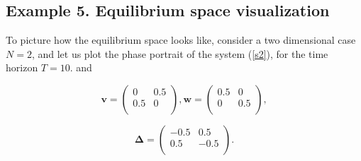 \documentclass[a4paper,10pt, english]{article}
\begin{document}
\newpage
\newpage
\newpage
\subsection{Example 5. Equilibrium space visualization}
To picture how the equilibrium space looks like, consider a two dimensional case  $N=2$, and let us plot the phase portrait of the system (\ref{s2}), for the time horizon $T = 10$. and

\[\mathbf{v} =  \left( \begin{array}{cc}
0 & 0.5  \\
0.5 & 0 \\
\end{array} \right),
%
\mathbf{w} = 
\left( \begin{array}{cc}
0.5 & 0 \\
0 & 0.5 \\
\end{array} \right),
\]


$$
\mathbf{\Delta} = 
\left(
\begin{matrix}
-0.5 & 0.5 \\
0.5 & -0.5 \\
\end{matrix}
\right).
$$
\end{document}
